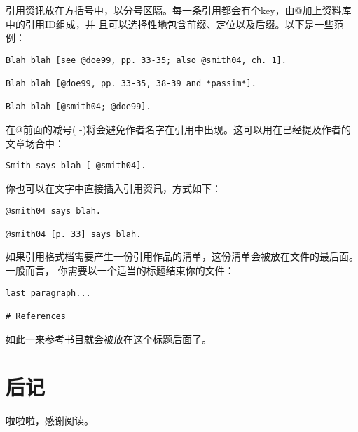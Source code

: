 \documentclass[fancyhdr,bookmark]{ctexbook}
\begin{document}
引用资讯放在方括号中，以分号区隔。每一条引用都会有个key，由@加上资料库中的引用ID组成，并
且可以选择性地包含前缀、定位以及后缀。以下是一些范例：

\begin{lstlisting}
Blah blah [see @doe99, pp. 33-35; also @smith04, ch. 1].

Blah blah [@doe99, pp. 33-35, 38-39 and *passim*].

Blah blah [@smith04; @doe99].
\end{lstlisting}

在@前面的减号(
-)将会避免作者名字在引用中出现。这可以用在已经提及作者的文章场合中：

\begin{lstlisting}
Smith says blah [-@smith04].
\end{lstlisting}

你也可以在文字中直接插入引用资讯，方式如下：

\begin{lstlisting}
@smith04 says blah.

@smith04 [p. 33] says blah.
\end{lstlisting}

如果引用格式档需要产生一份引用作品的清单，这份清单会被放在文件的最后面。一般而言，
你需要以一个适当的标题结束你的文件：

\begin{lstlisting}
last paragraph...

# References
\end{lstlisting}

如此一来参考书目就会被放在这个标题后面了。

\backmatter

\hypertarget{ux540eux8bb0}{%
\chapter{后记}\label{ux540eux8bb0}}

啦啦啦，感谢阅读。
\end{document}
